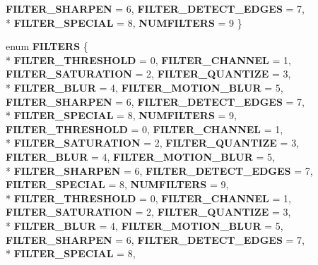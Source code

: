 \begin{DoxyCompactItemize}
{\bfseries F\-I\-L\-T\-E\-R\-\_\-\-S\-H\-A\-R\-P\-E\-N} = 6, 
{\bfseries F\-I\-L\-T\-E\-R\-\_\-\-D\-E\-T\-E\-C\-T\-\_\-\-E\-D\-G\-E\-S} = 7, 
\\*
{\bfseries F\-I\-L\-T\-E\-R\-\_\-\-S\-P\-E\-C\-I\-A\-L} = 8, 
{\bfseries N\-U\-M\-F\-I\-L\-T\-E\-R\-S} = 9
 \}
\item 
enum {\bfseries F\-I\-L\-T\-E\-R\-S} \{ \\*
{\bfseries F\-I\-L\-T\-E\-R\-\_\-\-T\-H\-R\-E\-S\-H\-O\-L\-D} = 0, 
{\bfseries F\-I\-L\-T\-E\-R\-\_\-\-C\-H\-A\-N\-N\-E\-L} = 1, 
{\bfseries F\-I\-L\-T\-E\-R\-\_\-\-S\-A\-T\-U\-R\-A\-T\-I\-O\-N} = 2, 
{\bfseries F\-I\-L\-T\-E\-R\-\_\-\-Q\-U\-A\-N\-T\-I\-Z\-E} = 3, 
\\*
{\bfseries F\-I\-L\-T\-E\-R\-\_\-\-B\-L\-U\-R} = 4, 
{\bfseries F\-I\-L\-T\-E\-R\-\_\-\-M\-O\-T\-I\-O\-N\-\_\-\-B\-L\-U\-R} = 5, 
{\bfseries F\-I\-L\-T\-E\-R\-\_\-\-S\-H\-A\-R\-P\-E\-N} = 6, 
{\bfseries F\-I\-L\-T\-E\-R\-\_\-\-D\-E\-T\-E\-C\-T\-\_\-\-E\-D\-G\-E\-S} = 7, 
\\*
{\bfseries F\-I\-L\-T\-E\-R\-\_\-\-S\-P\-E\-C\-I\-A\-L} = 8, 
{\bfseries N\-U\-M\-F\-I\-L\-T\-E\-R\-S} = 9, 
{\bfseries F\-I\-L\-T\-E\-R\-\_\-\-T\-H\-R\-E\-S\-H\-O\-L\-D} = 0, 
{\bfseries F\-I\-L\-T\-E\-R\-\_\-\-C\-H\-A\-N\-N\-E\-L} = 1, 
\\*
{\bfseries F\-I\-L\-T\-E\-R\-\_\-\-S\-A\-T\-U\-R\-A\-T\-I\-O\-N} = 2, 
{\bfseries F\-I\-L\-T\-E\-R\-\_\-\-Q\-U\-A\-N\-T\-I\-Z\-E} = 3, 
{\bfseries F\-I\-L\-T\-E\-R\-\_\-\-B\-L\-U\-R} = 4, 
{\bfseries F\-I\-L\-T\-E\-R\-\_\-\-M\-O\-T\-I\-O\-N\-\_\-\-B\-L\-U\-R} = 5, 
\\*
{\bfseries F\-I\-L\-T\-E\-R\-\_\-\-S\-H\-A\-R\-P\-E\-N} = 6, 
{\bfseries F\-I\-L\-T\-E\-R\-\_\-\-D\-E\-T\-E\-C\-T\-\_\-\-E\-D\-G\-E\-S} = 7, 
{\bfseries F\-I\-L\-T\-E\-R\-\_\-\-S\-P\-E\-C\-I\-A\-L} = 8, 
{\bfseries N\-U\-M\-F\-I\-L\-T\-E\-R\-S} = 9, 
\\*
{\bfseries F\-I\-L\-T\-E\-R\-\_\-\-T\-H\-R\-E\-S\-H\-O\-L\-D} = 0, 
{\bfseries F\-I\-L\-T\-E\-R\-\_\-\-C\-H\-A\-N\-N\-E\-L} = 1, 
{\bfseries F\-I\-L\-T\-E\-R\-\_\-\-S\-A\-T\-U\-R\-A\-T\-I\-O\-N} = 2, 
{\bfseries F\-I\-L\-T\-E\-R\-\_\-\-Q\-U\-A\-N\-T\-I\-Z\-E} = 3, 
\\*
{\bfseries F\-I\-L\-T\-E\-R\-\_\-\-B\-L\-U\-R} = 4, 
{\bfseries F\-I\-L\-T\-E\-R\-\_\-\-M\-O\-T\-I\-O\-N\-\_\-\-B\-L\-U\-R} = 5, 
{\bfseries F\-I\-L\-T\-E\-R\-\_\-\-S\-H\-A\-R\-P\-E\-N} = 6, 
{\bfseries F\-I\-L\-T\-E\-R\-\_\-\-D\-E\-T\-E\-C\-T\-\_\-\-E\-D\-G\-E\-S} = 7, 
\\*
{\bfseries F\-I\-L\-T\-E\-R\-\_\-\-S\-P\-E\-C\-I\-A\-L} = 8, 

\end{DoxyCompactItemize}
